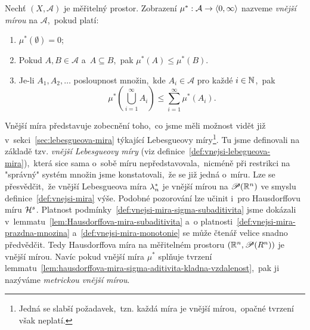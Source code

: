 \begin{definition}\label{def:vnejsi-mira}
    Nechť $(X,\mathcal{A})$ je měřitelný prostor. Zobrazení $\mu^*:\mathcal{A} \rightarrow \langle0,\infty\rangle$ nazveme \emph{vnější mírou} na $\mathcal{A}$,~pokud platí:
    \begin{enumerate}[label=(\alph*)]
        \item\label{def:vnejsi-mira-prazdna-mnozina} $\mu^*(\emptyset)=0$;
        \item\label{def:vnejsi-mira-monotonie} Pokud $A,B\in\mathcal{A}$ a~$A\subseteq B$,~pak $\mu^*(A)\leqslant\mu^*(B)$.
        \item\label{def:vnejsi-mira-sigma-subaditivita} Je-li $A_1,A_2,\ldots$ posloupnost množin,~kde $A_i\in\mathcal{A}$ pro každé $i\in\mathbb{N}$,~pak
        \[\mu^*\left(\bigcup_{i=1}^\infty A_i\right)\leqslant\sum_{i=1}^{\infty}\mu^*(A_i).\]
    \end{enumerate}
\end{definition}

Vnější míra představuje zobecnění toho,~co jsme měli možnost vidět již v~sekci~\ref{sec:lebesgueova-mira} týkající Lebesgueovy míry\footnote{Jedná se slabší požadavek,~tzn. každá míra je vnější mírou,~opačné tvrzení však neplatí.}. Tu jsme definovali na základě tzv. \emph{vnější Lebesgueovy míry} (viz definice~\ref{def:vnejsi-lebegueova-mira}),~která sice sama o~sobě míru nepředstavovala,~nicméně při restrikci na "správný" systém množin jsme konstatovali,~že se již jedná o~míru. Lze se přesvědčit,~že vnější Lebesgueova míra $\lambda_n^*$ je vnější mírou na $\mathscr{P}(\mathbb{R}^n)$ ve smyslu definice~\ref{def:vnejsi-mira} výše. Podobné pozorování lze učinit i~pro Hausdorffovu míru $\mathcal{H}^{s}$. Platnost podmínky~\ref{def:vnejsi-mira-sigma-subaditivita} jsme dokázali v~lemmatu~\ref{lem:Hausdorffova-mira-subaditivita} a~o platnosti~\ref{def:vnejsi-mira-prazdna-mnozina} a~\ref{def:vnejsi-mira-monotonie} se může čtenář velice snadno předvědčit. Tedy Hausdorffova míra na měřitelném prostoru $(\mathbb{R}^n,\mathscr{P}(R^n))$ je vnější mírou. Navíc pokud vnější míra $\mu^*$ splňuje tvrzení lemmatu~\ref{lem:hausdorffova-mira-sigma-aditivita-kladna-vzdalenost},~pak ji nazýváme \emph{metrickou vnější mírou}.

